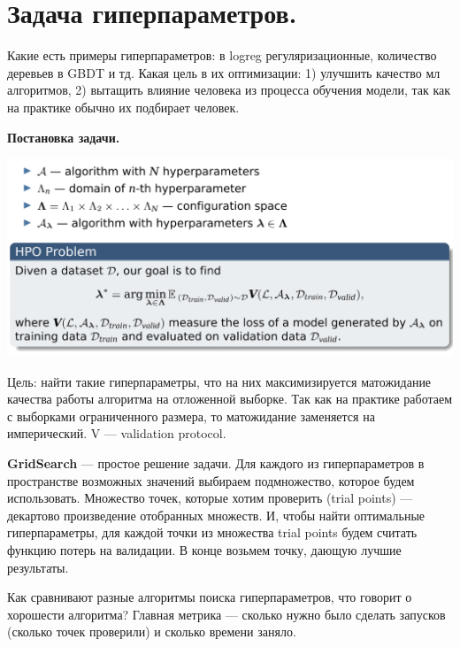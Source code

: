 \section{Задача гиперпараметров.}
Какие есть примеры гиперпараметров: в logreg регуляризационные, количество деревьев в GBDT и тд. Какая цель в их оптимизации: 1) улучшить качество мл алгоритмов, 2) вытащить влияние человека из процесса обучения модели, так как на практике обычно их подбирает человек.

\textbf{Постановка задачи.}
\begin{center}
    \includegraphics[scale=0.4]{figures/lecture7_problem.png}
\end{center}
Цель: найти такие гиперпараметры, что на них максимизируется матожидание качества работы алгоритма на отложенной выборке. Так как на практике работаем с выборками ограниченного размера, то матожидание заменяется на имперический. V --- validation protocol.

\textbf{GridSearch} --- простое решение задачи. Для каждого из гиперпараметров в пространстве возможных значений выбираем подмножество, которое будем использовать. Множество точек, которые хотим проверить (trial points) --- декартово произведение отобранных множеств. И, чтобы найти оптимальные гиперпараметры, для каждой точки из множества trial points будем считать функцию потерь на валидации. В конце возьмем точку, дающую лучшие результаты. 

Как сравнивают разные алгоритмы поиска гиперпараметров, что говорит о хорошести алгоритма? Главная метрика --- сколько нужно было сделать запусков (сколько точек проверили) и сколько времени заняло.

